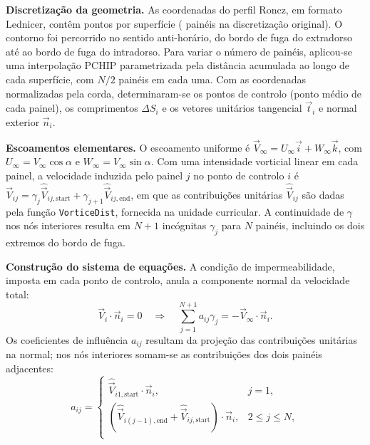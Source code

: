 \begin{etapas}
  \item \textbf{Discretização da geometria.} As coordenadas do perfil Roncz,
  em formato Lednicer, contêm \PontosExtradorso{} pontos por superfície (\NPaineisOriginais{} painéis na
  discretização original). O contorno foi percorrido no sentido anti-horário,
  do bordo de fuga do extradorso até ao bordo de fuga do intradorso. Para
  variar o número de painéis, aplicou-se uma interpolação PCHIP parametrizada
  pela distância acumulada ao longo de cada superfície, com $N/2$ painéis em
  cada uma. Com as coordenadas normalizadas pela corda, determinaram-se os
  pontos de controlo (ponto médio de cada painel), os comprimentos $\Delta S_i$
  e os vetores unitários tangencial $\vec{t}_i$ e normal exterior $\vec{n}_i$.
  \item \textbf{Escoamentos elementares.} O escoamento uniforme é
  $\vec{V}_\infty=U_\infty\vec{i}+W_\infty\vec{k}$, com
  $U_\infty=V_\infty\cos\alpha$ e $W_\infty=V_\infty\sin\alpha$. Com uma
  intensidade vorticial linear em cada painel, a velocidade induzida pelo
  painel $j$ no ponto de controlo $i$ é
  $\vec{V}_{ij}=\gamma_j\hat{\vec{V}}_{ij,\mathrm{start}}+\gamma_{j+1}\hat{\vec{V}}_{ij,\mathrm{end}}$,
  em que as contribuições unitárias $\hat{\vec{V}}_{ij}$ são dadas pela função
  \texttt{VorticeDist}, fornecida na unidade curricular. A continuidade de
  $\gamma$ nos nós interiores resulta em $N+1$ incógnitas $\gamma_j$ para $N$
  painéis, incluindo os dois extremos do bordo de fuga.
  \item \textbf{Construção do sistema de equações.} A condição de
  impermeabilidade, imposta em cada ponto de controlo, anula a componente
  normal da velocidade total:
  \begin{equation}
    \vec{V}_i\cdot\vec{n}_i=0
    \quad\Rightarrow\quad
    \sum_{j=1}^{N+1}a_{ij}\gamma_j=-\vec{V}_\infty\cdot\vec{n}_i .
    \label{eq:impermeabilidade}
  \end{equation}
  Os coeficientes de influência $a_{ij}$ resultam da projeção das
  contribuições unitárias na normal; nos nós interiores somam-se as
  contribuições dos dois painéis adjacentes:
  \begin{equation}
    a_{ij} =
    \begin{cases}
      \hat{\vec{V}}_{i1,\mathrm{start}}\cdot\vec{n}_i, & j=1,\\
      \left(\hat{\vec{V}}_{i(j-1),\mathrm{end}}+\hat{\vec{V}}_{ij,\mathrm{start}}\right)\cdot\vec{n}_i, & 2\leq j\leq N,\\

\end{cases}
\end{equation}
\end{etapas}
